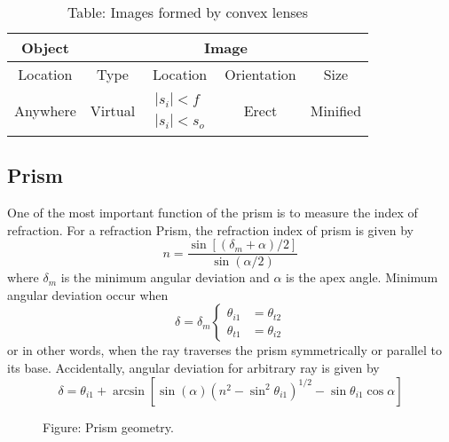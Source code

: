 \documentclass[../../../main.tex]{subfiles}
\begin{document}
\begin{table}
    \centering
    \caption*{Table: Images formed by convex lenses}
    \begin{tabular}{ccccc}
        \toprule
        Object & \multicolumn{4}{c}{Image}\\
        \midrule
        Location & Type & Location & Orientation & Size\\
        \midrule
        Anywhere &Virtual &$\begin{matrix}|s_i|<f \\|s_i|<s_o\end{matrix}$ &Erect &Minified \\
        \bottomrule
    \end{tabular}
\end{table}

\subsection*{Prism}
One of the most important function of the prism is to measure the index of refraction. For a refraction Prism, the refraction index of prism is given by 
\begin{equation*}
    n=\frac{\sin [(\delta_m+\alpha)/2]}{\sin (\alpha/2)}
\end{equation*}
where $\delta_m$ is the minimum angular deviation and $\alpha$ is the apex angle. Minimum angular deviation occur when 
\begin{equation*}
    \delta=\delta_m\begin{cases}
        \theta_{i1}&=\theta_{t2}\\
        \theta_{t1}&=\theta_{i2}
    \end{cases}
\end{equation*}
or in other words, when the ray traverses the prism symmetrically or parallel to its base. Accidentally, angular deviation for arbitrary ray is given by 
\begin{equation*}
    \delta=\theta_{i1}+\arcsin\left[ \sin (\alpha)\left(n^2-\sin^2\theta_{i1}\right)^{1/2}-\sin\theta_{i1}\cos\alpha\right]
\end{equation*}

\begin{figure}
    \centering
    \caption*{Figure: Prism geometry.}
\end{figure}
\end{document}
